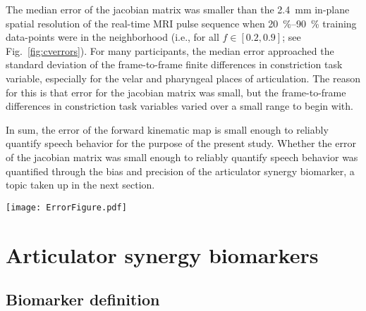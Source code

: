 \documentclass[preprint]{JASAnew}\usepackage[]{graphicx}\usepackage[]{color}
\begin{document}
The median error of the jacobian matrix was smaller than the \SI{2.4}{\milli\meter} in-plane spatial resolution of the real-time MRI pulse sequence when \SIrange{20}{90}{\percent} training data-points were in the neighborhood (i.e., for all $f\in \left[ 0.2, 0.9\right]$; see Fig.~\ref{fig:cverrors}).
%
For many participants, the median error approached the standard deviation of the frame-to-frame finite differences in constriction task variable, especially for the velar and pharyngeal places of articulation.
%
The reason for this is that error for the jacobian matrix was small, but the frame-to-frame differences in constriction task variables varied over a small range to begin with. 

In sum, the error of the forward kinematic map is small enough to reliably quantify speech behavior for the purpose of the present study.
% 
Whether the error of the jacobian matrix was small enough to reliably quantify speech behavior was quantified through the bias and precision of the articulator synergy biomarker, a topic taken up in the next section. 

\begin{figure*}
\raggedright

\texttt{[image: ErrorFigure.pdf]}

\caption{(color online) 
{\bf (a)} Median error (solid line) and 10\textsuperscript{th}-90\textsuperscript{th} percentile error range (shaded) of the forward kinematic map estimator of constriction task variables. {\bf (b)} Median error (line) and 10\textsuperscript{th}-90\textsuperscript{th} percentile error range (shaded) of the jacobian matrix estimator of frame-to-frame finite differences in constriction task variables. 
Data-points are the errors computed over all 10 folds of cross-validation.
Neighborhood size is given as percentage of training data-points.
The standard deviation of observed (frame-to-frame finite differences in) constriction task variables is indicated as a dashed line whenever the standard deviation is small enough to fit within the $y$-axis limits.}
\label{fig:cverrors}
\end{figure*}




\section{Articulator synergy biomarkers}
\label{sec:articulator_synergy_biomarker}

\subsection{Biomarker definition}
\end{document}
